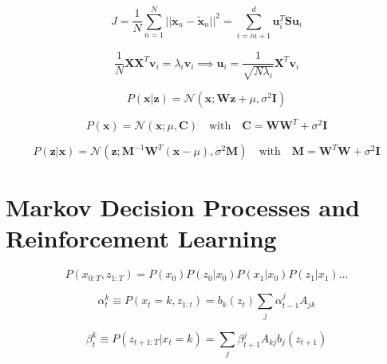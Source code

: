 \documentclass{article}
\begin{document}
\begin{equation}
    J = \frac{1}{N} \sum_{n=1}^N ||\mathbf{x}_n - \tilde{\mathbf{x}}_n||^2 = \sum_{i=m+1}^d \mathbf{u}_i^T \mathbf{S} \mathbf{u}_i
\end{equation}

\begin{equation}
    \frac{1}{N} \mathbf{X} \mathbf{X}^T \mathbf{v}_i = \lambda_i \mathbf{v}_i \implies \mathbf{u}_i = \frac{1}{\sqrt{N \lambda_i}} \mathbf{X}^T \mathbf{v}_i
\end{equation}

\begin{equation}
    P(\mathbf{x}|\mathbf{z}) = \mathcal{N}(\mathbf{x}; \mathbf{W}\mathbf{z} + \mu, \sigma^2 \mathbf{I})
\end{equation}

\begin{equation}
    P(\mathbf{x}) = \mathcal{N}(\mathbf{x}; \mu, \mathbf{C}) \quad \text{with} \quad \mathbf{C} = \mathbf{W}\mathbf{W}^T + \sigma^2 \mathbf{I}
\end{equation}

\begin{equation}
    P(\mathbf{z}|\mathbf{x}) = \mathcal{N}(\mathbf{z}; \mathbf{M}^{-1}\mathbf{W}^T(\mathbf{x} - \mu), \sigma^2 \mathbf{M}) \quad \text{with} \quad \mathbf{M} = \mathbf{W}^T \mathbf{W} + \sigma^2 \mathbf{I}
\end{equation}


\section{Markov Decision Processes and Reinforcement Learning}

\begin{equation}
    P(x_{0:T}, z_{1:T}) = P(x_0)P(z_0|x_0)P(x_1|x_0)P(z_1|x_1) \dots
\end{equation}

\begin{equation}
    \alpha_t^k \equiv P(x_t = k, z_{1:t}) = b_k(z_t) \sum_j \alpha_{t-1}^j A_{jk}
\end{equation}

\begin{equation}
    \beta_t^k \equiv P(z_{t+1:T} | x_t = k) = \sum_j \beta_{t+1}^j A_{kj} b_j(z_{t+1})
\end{equation}
\end{document}

